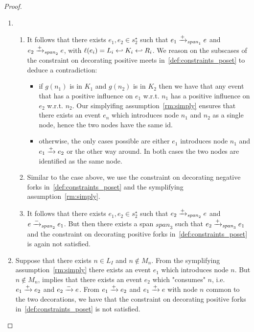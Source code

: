 \begin{proof}
  \begin{enumerate}
  \item
    \begin{enumerate}
    \item It follows that there exists $e_1,e_2\in s_2^{\star}$ such that $e_1\mathrel{\xrightarrow{+}}_{\mathit{span}_1} e$ and $e_2\mathrel{\xrightarrow{+}}_{\mathit{span}_2} e$, with $\ell(e_i) = L_i\hookleftarrow K_i\hookleftarrow R_i$. We reason on the subscases of the constraint on decorating positive meets in~\autoref{def:constraints_poset} to deduce a contradiction:
      \begin{itemize}
      \item if $g(n_1)$ is in $K_1$ and $g(n_2)$ is in $K_2$ then we have that any event that has a positive influence on $e_1$ w.r.t. $n_1$ has a positive influence on $e_2$ w.r.t. $n_2$. Our simplyifing assumption~\autoref{rm:simply} ensures that there exists an event $e_n$ which introduces node $n_1$ and $n_2$ as a single node, hence the two nodes have the same id.
      \item otherwise, the only cases possible are either $e_1$ introduces node $n_1$ and $e_1\mathrel{\xrightarrow{+}} e_2$ or the other way around. In both cases the two nodes are identified as the same node.
      \end{itemize}
    \item Similar to the case above, we use the constraint on decorating negative forks in~\autoref{def:constraints_poset} and the symplifying assumption~\autoref{rm:simply}.
    \item It follows that there exists $e_1,e_2\in s_2^{\star}$ such that $e_2\mathrel{\xrightarrow{+}}_{\mathit{span}_2} e$ and $e\mathrel{\xrightarrow{-}}_{\mathit{span}_2} e_1$. But then there exists a span ${\mathit{span}_3}$ such that $e_2\mathrel{\xrightarrow{+}}_{\mathit{span}_3} e_1$ and the constraint on decorating positive forks in~\autoref{def:constraints_poset} is again not satisfied.
    \end{enumerate}
  \item Suppose that there exists $n\in L_I$ and $n\notin M_n$. From the symplifying assumption~\autoref{rm:simply} there exists an event $e_1$ which introduces node $n$. But $n\notin M_n$, implies that there exists an event $e_2$ which "consumes" $n$, i.e. $e_1\mathrel{\xrightarrow{+}} e_2$ and $e_2\mathrel{\xrightarrow{-}} e$. %
From $e_1\mathrel{\xrightarrow{+}} e_2$ and $e_1\mathrel{\xrightarrow{+}} e$ with node $n$ common to the two decorations, we have that the constraint on decorating positive forks in~\autoref{def:constraints_poset} is not satisfied.
  \end{enumerate}
\end{proof}

